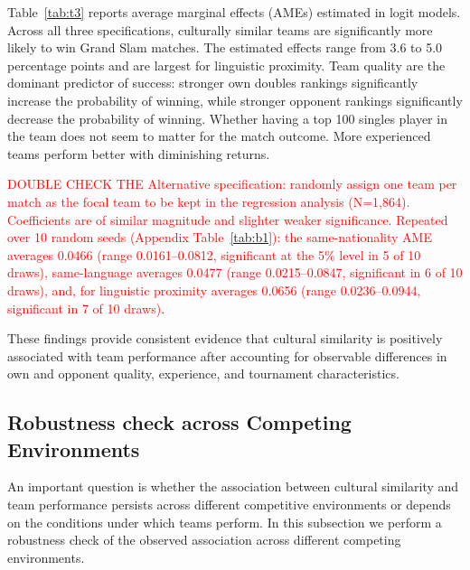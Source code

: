 \documentclass[10pt]{article}
\begin{document}
Table~\ref{tab:t3} reports average marginal effects (AMEs) estimated in logit models. %
Across all three specifications, culturally similar teams are significantly more likely to win Grand Slam matches. The estimated effects range from 3.6 to 5.0 percentage points and are largest for linguistic proximity. Team quality are the dominant predictor of success: stronger own doubles rankings significantly increase the probability of winning, while stronger opponent rankings significantly decrease the probability of winning. Whether having a top 100 singles player in the team does not seem to matter for the match outcome. More experienced teams perform better with diminishing returns.

\textcolor{red}{DOUBLE CHECK THE Alternative specification: randomly assign one team per match as the focal team to be kept in the regression analysis (N=1,864). Coefficients are of similar magnitude and slighter weaker significance. Repeated over 10 random seeds (Appendix Table~\ref{tab:b1}): the same-nationality AME averages 0.0466 (range 0.0161--0.0812, significant at the 5\% level in 5 of 10 draws), same-language averages 0.0477 (range 0.0215--0.0847, significant in 6 of 10 draws), and, for linguistic proximity averages 0.0656 (range 0.0236--0.0944, significant in 7 of 10 draws)}.

These findings provide consistent evidence that cultural similarity is positively associated with team performance after accounting for observable differences in own and opponent quality,  experience, and tournament characteristics.


\subsection{Robustness check across Competing Environments} 


An important question is whether the association between cultural similarity and team performance persists across different competitive environments or depends on the conditions under which teams perform.  In this subsection we perform a robustness check of the observed association across different  competing environments.
\end{document}
